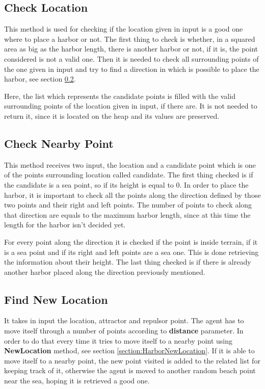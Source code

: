 \documentclass[12pt]{article}
\begin{document}
    \subsection{Check Location} \label{harbor:checkLocation}
    This method is used for checking if the location given in input is a good one where to place a harbor or not. The first thing to check is whether, in a squared area
    as big as the harbor length, there is another harbor or not, if it is, the point considered is not a valid one. Then it is needed to check all surrounding points of the 
    one given in input and try to find a direction in which is possible to place the harbor, see section \ref{section:harborNearby}.

    Here, the list which represents the candidate points is filled with the valid surrounding points of the location given in input, if there are. It is not needed to return it,
    since it is located on the heap and its values are preserved. 
    
    \subsection{Check Nearby Point} \label{section:harborNearby}
    This method receives two input, the location and a candidate point which is one of the points surrounding location called candidate. The first thing checked is
    if the candidate is a sea point, so if its height is equal to 0. In order to place the harbor, it is important to check all the points along the direction defined by those
    two points and their right and left points. The number of points to check along that direction are equals to the maximum harbor length, since at this time the length for 
    the harbor isn't decided yet.

    For every point along the direction it is checked if the point is inside terrain, if it is a sea point and if its right and left points are a sea one. This is done
    retrieving the information about their height. The last thing checked is if there is already another harbor placed along the direction previously mentioned.

    \subsection{Find New Location} \label{section:harborNew}
    It takes in input the location, attractor and repulsor point. The agent has to move itself through a number of points according to \textbf{distance} parameter. In order
    to do that every time it tries to move itself to a nearby point using \textbf{NewLocation} method, see section \ref{section:HarborNewLocation}. If it is able to move itself to a
    nearby point, the new point visited is added to the related list for keeping track of it, otherwise the agent is moved to another random beach point near the sea, hoping
    it is retrieved a good one.
\end{document}
